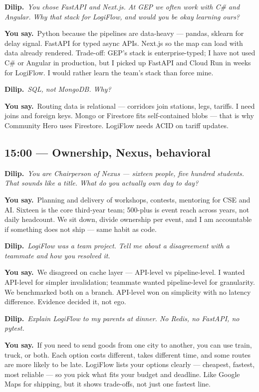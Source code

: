 \documentclass[11pt,a4paper]{article}
\newcommand{\IV}[1]{\par\vspace{4pt}\noindent\textcolor{qcol}{\textbf{Dilip.}}~\textit{#1}\par}
\newcommand{\You}[1]{%
  \par\vspace{2pt}%
  \noindent\colorbox{youbg}{%
    \parbox{\dimexpr\textwidth-2\fboxsep}{\vspace{3pt}\textcolor{you}{\textbf{\small You say.}}~#1\vspace{3pt}}%
  }\par}
\begin{document}
\IV{You chose FastAPI and Next.js. At GEP we often work with C\# and Angular. Why that stack for LogiFlow, and would you be okay learning ours?}

\You{Python because the pipelines are data-heavy --- pandas, sklearn for delay signal. FastAPI for typed async APIs. Next.js so the map can load with data already rendered. Trade-off: GEP's stack is enterprise-typed; I have not used C\# or Angular in production, but I picked up FastAPI and Cloud Run in weeks for LogiFlow. I would rather learn the team's stack than force mine.}

\IV{SQL, not MongoDB. Why?}

\You{Routing data is relational --- corridors join stations, legs, tariffs. I need joins and foreign keys. Mongo or Firestore fits self-contained blobs --- that is why Community Hero uses Firestore. LogiFlow needs ACID on tariff updates.}

\subsection*{15:00 --- Ownership, Nexus, behavioral}

\IV{You are Chairperson of Nexus --- sixteen people, five hundred students. That sounds like a title. What do you \emph{actually} own day to day?}

\You{Planning and delivery of workshops, contests, mentoring for CSE and AI. Sixteen is the core third-year team; 500-plus is event reach across years, not daily headcount. We sit down, divide ownership per event, and I am accountable if something does not ship --- same habit as code.}

\IV{LogiFlow was a team project. Tell me about a disagreement with a teammate and how you resolved it.}

\You{We disagreed on cache layer --- API-level vs pipeline-level. I wanted API-level for simpler invalidation; teammate wanted pipeline-level for granularity. We benchmarked both on a branch. API-level won on simplicity with no latency difference. Evidence decided it, not ego.}

\IV{Explain LogiFlow to my parents at dinner. No Redis, no FastAPI, no pytest.}

\You{If you need to send goods from one city to another, you can use train, truck, or both. Each option costs different, takes different time, and some routes are more likely to be late. LogiFlow lists your options clearly --- cheapest, fastest, most reliable --- so you pick what fits your budget and deadline. Like Google Maps for shipping, but it shows trade-offs, not just one fastest line.}
\end{document}
